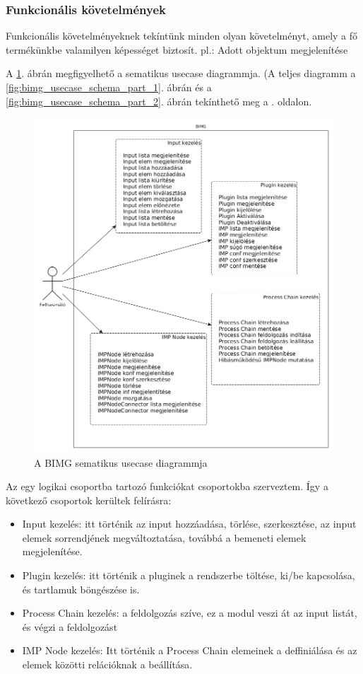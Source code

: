 \documentclass[a4paper,12pt,oneside]{report}
\begin{document}
\subsubsection{Funkcionális követelmények}
Funkcionális követelményeknek tekíntünk minden olyan követelményt, amely a fő termékünkbe valamilyen képességet biztosít. pl.: Adott objektum megjelenítése \cite{website:soft_func_req_ibm}

A \ref{fig:bimg_usecase_schema}. ábrán megfigyelhető a sematikus usecase diagrammja. (A teljes diagramm a \ref{fig:bimg_usecase_schema_part_1}. ábrán és a \ref{fig:bimg_usecase_schema_part_2}. ábrán tekínthető meg a \pageref{fig:bimg_usecase_schema_part_1}. oldalon.
\begin{figure}[h]
  \includegraphics[width=\textwidth]{schematic_usecase.png}
  \caption{A BIMG sematikus usecase diagrammja}
  \label{fig:bimg_usecase_schema}
\end{figure}
Az egy logikai csoportba tartozó funkciókat csoportokba szerveztem. Így a következő csoportok kerültek felírásra:

\begin{itemize}
	\itemsep0em
	\item Input kezelés: itt történik az input hozzáadása, törlése, szerkesztése, az input elemek sorrendjének megváltoztatása, továbbá a bemeneti elemek megjelenítése.

	\item Plugin kezelés: itt történik a pluginek a rendszerbe töltése, ki/be kapcsolása, és tartlamuk böngészése is.
	\item Process Chain kezelés: a feldolgozás szíve, ez a modul veszi át az input listát, és végzi a feldolgozást
	\item IMP Node kezelés: Itt történik a Process Chain elemeinek a deffiniálása és az elemek közötti relációknak a beállítása.
\end{itemize}
\end{document}
